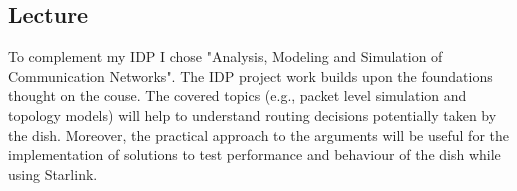 \documentclass[NET,a4paper,12pt,english]{netforms}
\begin{document}
  \subsection*{Lecture}
  To complement my IDP I chose "Analysis, Modeling and Simulation of Communication Networks". The IDP project work builds upon the foundations thought on the couse. The covered topics (e.g., packet level simulation and topology models) will help to understand routing decisions potentially taken by the dish. Moreover, the practical approach to the arguments will be useful for the implementation of solutions to test performance and behaviour of the dish while using Starlink.


\scriptsize

\end{document}
